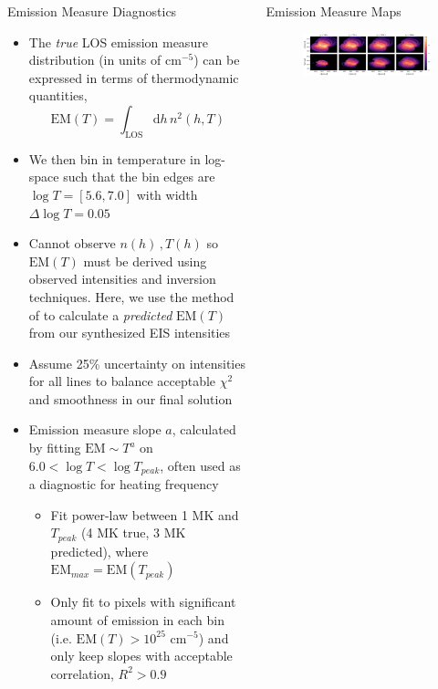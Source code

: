 \documentclass[final]{beamer}
\begin{document}
\begin{frame}
\begin{columns}[T]
\begin{column}{0.49\linewidth}
\begin{block}{Emission Measure Diagnostics}
\begin{itemize}
        \item The \alert{\textit{true}} LOS emission measure distribution (in units of $\mathrm{cm}^{-5}$) can be expressed in terms of thermodynamic quantities,
              \begin{equation*}
                \mathrm{EM}(T) = \int_{\mathrm{LOS}}\mathrm{d}h\,n^2(h,T)
              \end{equation*} 
        \item We then bin in temperature in log-space such that the bin edges are $\log{T}=[5.6,7.0]$ with width $\Delta\log{T}=0.05$
        \item Cannot observe $n(h)\,,T(h)$ so $\mathrm{EM}(T)$ must be derived using observed intensities and inversion techniques. Here, we use the method of \citet{hannah_differential_2012} to calculate a \alert{\textit{predicted}} $\mathrm{EM}(T)$ from our synthesized EIS intensities
        \item Assume 25\% uncertainty on intensities for all lines to balance acceptable $\chi^2$ and smoothness in our final solution
        \item Emission measure slope $a$, calculated by fitting $\mathrm{EM}\sim T^a$ on $6.0<\log{T}<\log{T_{peak}}$, often used as a diagnostic for heating frequency
        \begin{itemize}
          \item Fit power-law between 1 MK and $T_{peak}$ (4 MK true, 3 MK predicted), where $\mathrm{EM}_{max}=\mathrm{EM}(T_{peak})$
          \item Only fit to pixels with significant amount of emission in each bin (i.e. $\mathrm{EM}(T)>10^{25}\,\,\mathrm{cm}^{-5}$) and only keep slopes with acceptable correlation, $R^2>0.9$
        \end{itemize}
      \end{itemize}
    \end{block}
  \end{column}
  \begin{column}{0.49\linewidth}
    \begin{block}{Emission Measure Maps}
      \begin{figure}
        \includegraphics[width=\columnwidth]{figures/total_em_maps.pdf}

\end{figure}
\end{block}
\end{column}
\end{columns}
\end{frame}
\end{document}
